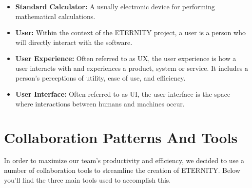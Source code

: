 \documentclass[11pt,onside]{report}
\begin{document}
\begin{itemize}
    \item \textbf{Standard Calculator:} A usually electronic device for performing mathematical calculations. \cite{calculator}
    
    \item \textbf{User:} Within the context of the ETERNITY project, a user is a person who will directly interact with the software.
    
    \item \textbf{User Experience:} Often referred to as UX, the user experience is how a user interacts with and experiences a product, system or service. It includes a person's perceptions of utility, ease of use, and efficiency. \cite{ux}
    
    \item \textbf{User Interface:} Often referred to as UI, the user interface is the space where interactions between humans and machines occur. \cite{ui}
    
\end{itemize}

\section{Collaboration Patterns And Tools}
In order to maximize our team's productivity and efficiency, we decided to use a number of collaboration tools to streamline the creation of ETERNITY. Below you'll find the three main tools used to accomplish this.
\end{document}
